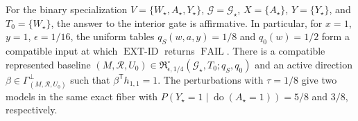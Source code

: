 For the binary specialization \(V=\{W_\star,A_\star,Y_\star\}\), \(\mathcal G=\mathcal G_\star\), \(X=\{A_\star\}\), \(Y=\{Y_\star\}\), and \(T_0=\{W_\star\}\), the answer to the interior gate is affirmative.  In particular, for \(x=1\), \(y=1\), \(\epsilon=1/16\), the uniform tables \(q_S(w,a,y)=1/8\) and \(q_0(w)=1/2\) form a compatible input at which \(\operatorname{EXT\text{-}ID}\) returns \(\operatorname{FAIL}\).  There is a compatible represented baseline \((M,\mathcal R,U_0)\in\mathfrak R_{\epsilon,1/4}^{\circ}(\mathcal G_\star,T_0;q_S,q_0)\) and an active direction \(\beta\in\Gamma_{(M,\mathcal R,U_0)}^\perp\) such that \(\beta^{\mathsf T}h_{1,1}=1\).  The perturbations with \(\tau=1/8\) give two models in the same exact fiber with \(P(Y_\star=1\mid\operatorname{do}(A_\star=1))=5/8\) and \(3/8\), respectively.